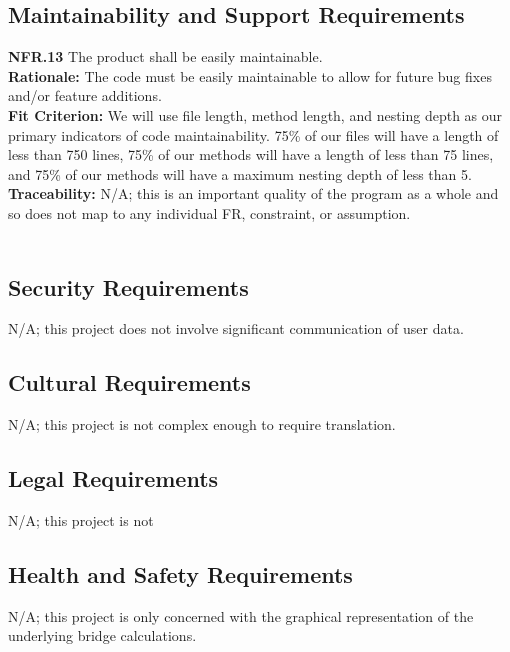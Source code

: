 \documentclass[12pt]{article}
\begin{document}
\subsection{Maintainability and Support Requirements}

  \textbf{NFR.13} The product shall be easily maintainable.\\
  \textbf{Rationale:} The code must be easily maintainable to allow for future bug fixes and/or feature additions.\\
  \textbf{Fit Criterion:} We will use file length, method length, and nesting depth as our primary indicators of code maintainability.
  75\% of our files will have a length of less than 750 lines, 75\% of our methods will have a length of less than 75 lines, and 75\% of our methods will have a maximum nesting depth of less than 5.\\
  \textbf{Traceability:} N/A; this is an important quality of the program as a whole and so does not map to any individual FR, constraint, or assumption.\\\\

\subsection{Security Requirements}

N/A; this project does not involve significant communication of user data.\\

\subsection{Cultural Requirements}

N/A; this project is not complex enough to require translation.\\

\subsection{Legal Requirements}

N/A; this project is not 

\subsection{Health and Safety Requirements}

N/A; this project is only concerned with the graphical representation of the underlying bridge calculations.\\
\end{document}

